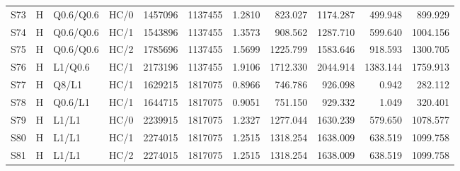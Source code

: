 \begin{longtable}{llllrrrrrrr}
S73 & H & Q0.6/Q0.6 & HC/0 & 1457096 & 1137455 & 1.2810 & 823.027 & 1174.287 & 499.948 & 899.929\\
S74 & H & Q0.6/Q0.6 & HC/1 & 1543896 & 1137455 & 1.3573 & 908.562 & 1287.710 & 599.640 & 1004.156\\
S75 & H & Q0.6/Q0.6 & HC/2 & 1785696 & 1137455 & 1.5699 & 1225.799 & 1583.646 & 918.593 & 1300.705\\
S76 & H & L1/Q0.6 & HC/1 & 2173196 & 1137455 & 1.9106 & 1712.330 & 2044.914 & 1383.144 & 1759.913\\
S77 & H & Q8/L1 & HC/1 & 1629215 & 1817075 & 0.8966 & 746.786 & 926.098 & 0.942 & 282.112\\
S78 & H & Q0.6/L1 & HC/1 & 1644715 & 1817075 & 0.9051 & 751.150 & 929.332 & 1.049 & 320.401\\
S79 & H & L1/L1 & HC/0 & 2239915 & 1817075 & 1.2327 & 1277.044 & 1630.239 & 579.650 & 1078.577\\
S80 & H & L1/L1 & HC/1 & 2274015 & 1817075 & 1.2515 & 1318.254 & 1638.009 & 638.519 & 1099.758\\
S81 & H & L1/L1 & HC/2 & 2274015 & 1817075 & 1.2515 & 1318.254 & 1638.009 & 638.519 & 1099.758\\
\end{longtable}\endgroup

